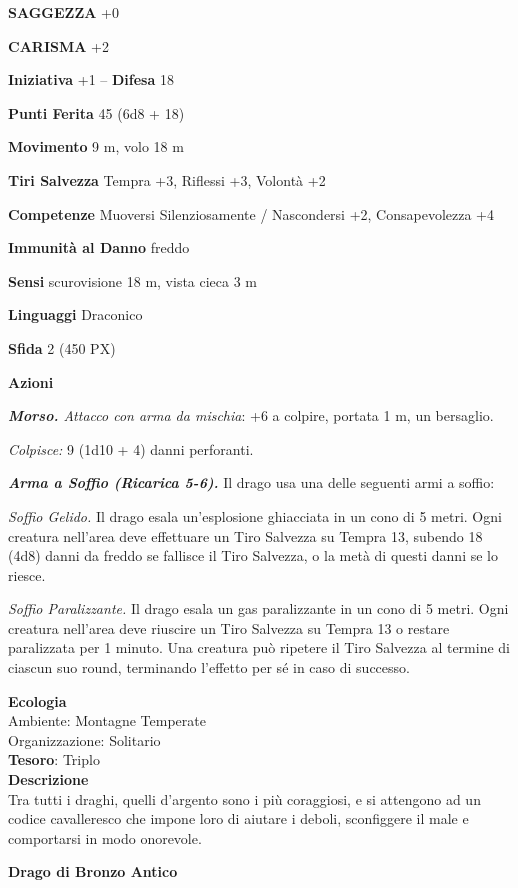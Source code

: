 \begin{multicols}{2}
	\textbf{SAGGEZZA} +0

	\textbf{CARISMA} +2

	\textbf{Iniziativa} +1 -- \textbf{Difesa} 18

	\textbf{Punti Ferita} 45 (6d8 + 18)

	\textbf{Movimento} 9 m, volo 18 m

	\textbf{Tiri Salvezza} Tempra +3, Riflessi +3, Volontà +2

	\textbf{Competenze} Muoversi Silenziosamente / Nascondersi +2, Consapevolezza +4

	\textbf{Immunità al Danno} freddo

	\textbf{Sensi} scurovisione 18 m, vista cieca 3 m

	\textbf{Linguaggi} Draconico

	\textbf{Sfida} 2 (450 PX)

	\textbf{Azioni}

	\textit{\textbf{Morso.} Attacco con arma da mischia}: +6 a colpire, portata 1 m, un bersaglio.

	\textit{Colpisce:} 9 (1d10 + 4) danni perforanti.

	\textit{\textbf{Arma a Soffio (Ricarica 5-6).}} Il drago usa una delle seguenti armi a soffio:

	\textit{Soffio Gelido.} Il drago esala un'esplosione ghiacciata in un cono di 5 metri. Ogni creatura nell'area deve effettuare un Tiro Salvezza su Tempra 13, subendo 18 (4d8) danni da freddo se fallisce il Tiro Salvezza, o la metà di questi danni se lo riesce.

	\textit{Soffio Paralizzante.} Il drago esala un gas paralizzante in un cono di 5 metri. Ogni creatura nell'area deve riuscire un Tiro Salvezza su Tempra 13 o restare paralizzata per 1 minuto. Una creatura può ripetere il Tiro Salvezza al termine di ciascun suo round, terminando l'effetto per sé in caso di successo.

	\textbf{Ecologia}\\
	Ambiente: Montagne Temperate\\
	Organizzazione: Solitario\\
	\textbf{Tesoro}: Triplo\\
	\textbf{Descrizione}\\
	Tra tutti i draghi, quelli d'argento sono i più coraggiosi, e si attengono ad un codice cavalleresco che impone loro di aiutare i deboli, sconfiggere il male e comportarsi in modo onorevole.


	\medskip{}\textbf{Drago di Bronzo Antico}


\end{multicols}
